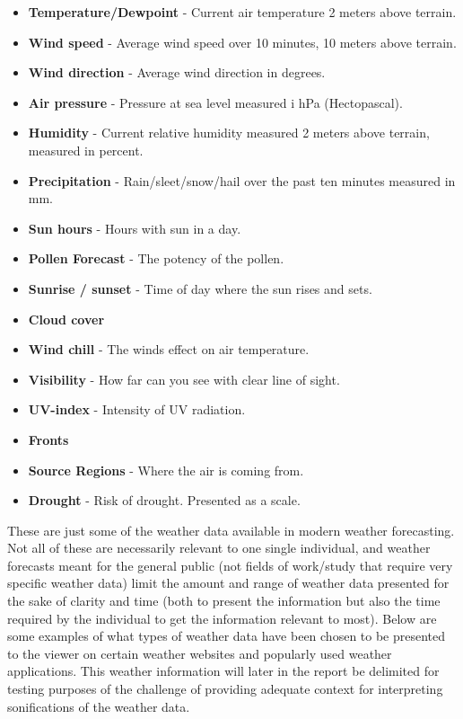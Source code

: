 \begin{itemize}
     \item \textbf{Temperature/Dewpoint} - Current air temperature 2 meters above terrain.
     \item \textbf{Wind speed} - Average wind speed over 10 minutes, 10 meters above terrain.
     \item \textbf{Wind direction} - Average wind direction in degrees.
     \item \textbf{Air pressure} - Pressure at sea level measured i hPa (Hectopascal).
     \item \textbf{Humidity} - Current relative humidity measured 2 meters above terrain, measured in percent.
     \item \textbf{Precipitation} - Rain/sleet/snow/hail over the past ten minutes measured in mm.
     \item \textbf{Sun hours} - Hours with sun in a day.
     \item \textbf{Pollen Forecast} - The potency of the pollen. 
     \item \textbf{Sunrise / sunset} - Time of day where the sun rises and sets.
     \item \textbf{Cloud cover}
     \item \textbf{Wind chill} - The winds effect on air temperature.
     \item \textbf{Visibility} - How far can you see with clear line of sight.
     \item \textbf{UV-index} - Intensity of UV radiation.
     \item \textbf{Fronts} 
     \item \textbf{Source Regions} - Where the air is coming from.
     \item \textbf{Drought} - Risk of drought. Presented as a scale.
 \end{itemize}

These are just some of the weather data available in modern weather forecasting. 
Not all of these are necessarily relevant to one single individual, and weather forecasts meant for the general public (not fields of work/study that require very specific weather data) limit the amount and range of weather data presented for the sake of clarity and time (both to present the information but also the time required by the individual to get the information relevant to most). 
Below are some examples of what types of weather data have been chosen to be presented to the viewer on certain weather websites and popularly used weather applications. 
This weather information will later in the report be delimited for testing purposes of the challenge of providing adequate context for interpreting sonifications of the weather data.

